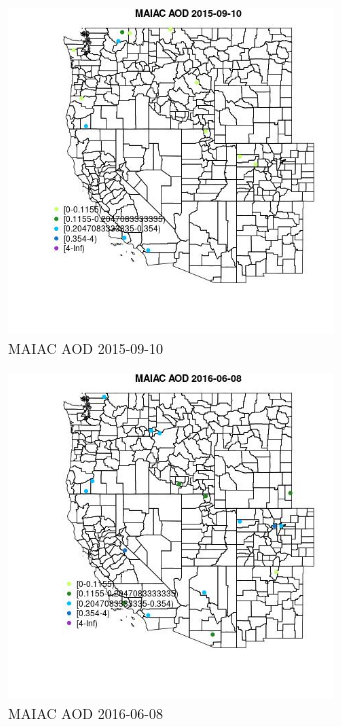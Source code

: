 \begin{figure} 
\centering  
\includegraphics[width=0.77\textwidth]{Code_Outputs/Report_ML_input_PM25_Step4_part_e_de_duplicated_aves_MapObsMAIAC_AOD2015-09-10.jpg} 
\caption{\label{fig:Report_ML_input_PM25_Step4_part_e_de_duplicated_avesMapObsMAIAC_AOD2015-09-10}MAIAC AOD 2015-09-10} 
\end{figure} 
 

\clearpage 

\begin{figure} 
\centering  
\includegraphics[width=0.77\textwidth]{Code_Outputs/Report_ML_input_PM25_Step4_part_e_de_duplicated_aves_MapObsMAIAC_AOD2016-06-08.jpg} 
\caption{\label{fig:Report_ML_input_PM25_Step4_part_e_de_duplicated_avesMapObsMAIAC_AOD2016-06-08}MAIAC AOD 2016-06-08} 
\end{figure} 
 

